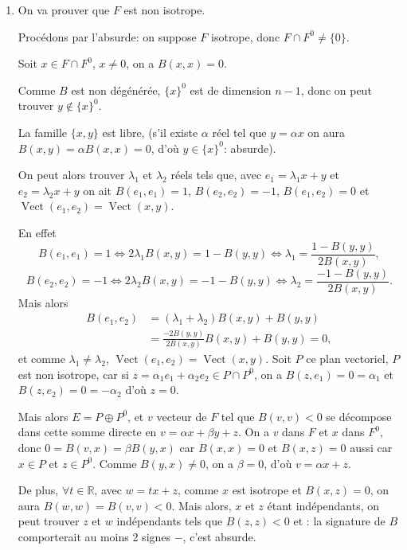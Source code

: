\begin{enumerate}[label=\arabic*.,leftmargin=2.2em,itemsep=1.1em]

\item On va prouver que $F$ est non isotrope.

Procédons par l'absurde: on suppose $F$ isotrope, donc $F\cap F^0\ne\{0\}$.

Soit $x\in F\cap F^0$, $x\ne0$, on a $B(x,x)=0$.

Comme $B$ est non dégénérée, $\{x\}^0$ est de dimension $n-1$, donc on peut trouver $y\notin\{x\}^0$.

La famille $\{x,y\}$ est libre, (s'il existe $\alpha$ réel tel que $y=\alpha x$ on aura $B(x,y)=\alpha B(x,x)=0$, d'où $y\in\{x\}^0$: absurde).

On peut alors trouver $\lambda_1$ et $\lambda_2$ réels tels que, avec $e_1=\lambda_1x+y$ et $e_2=\lambda_2x+y$ on ait $B(e_1,e_1)=1$, $B(e_2,e_2)=-1$, $B(e_1,e_2)=0$ et $\operatorname{Vect}(e_1,e_2)=\operatorname{Vect}(x,y)$.

En effet
\[
B(e_1,e_1)=1
\Longleftrightarrow 2\lambda_1B(x,y)=1-B(y,y)
\Longleftrightarrow
\lambda_1=\frac{1-B(y,y)}{2B(x,y)},
\]
\[
B(e_2,e_2)=-1
\Longleftrightarrow 2\lambda_2B(x,y)=-1-B(y,y)
\Longleftrightarrow
\lambda_2=\frac{-1-B(y,y)}{2B(x,y)}.
\]
Mais alors
\[
\begin{aligned}
B(e_1,e_2)
&=(\lambda_1+\lambda_2)B(x,y)+B(y,y)\\
&=\frac{-2B(y,y)}{2B(x,y)}B(x,y)+B(y,y)=0,
\end{aligned}
\]
et comme $\lambda_1\ne\lambda_2$, $\operatorname{Vect}(e_1,e_2)=\operatorname{Vect}(x,y)$. Soit $P$ ce plan vectoriel, $P$ est non isotrope, car si $z=\alpha_1e_1+\alpha_2e_2\in P\cap P^0$, on a $B(z,e_1)=0=\alpha_1$ et $B(z,e_2)=0=-\alpha_2$ d'où $z=0$.

Mais alors $E=P\oplus P^0$, et $v$ vecteur de $F$ tel que $B(v,v)<0$ se décompose dans cette somme directe en $v=\alpha x+\beta y+z$. On a $v$ dans $F$ et $x$ dans $F^0$, donc $0=B(v,x)=\beta B(y,x)$ car $B(x,x)=0$ et $B(x,z)=0$ aussi car $x\in P$ et $z\in P^0$. Comme $B(y,x)\ne0$, on a $\beta=0$, d'où $v=\alpha x+z$.

De plus, $\forall t\in\mathbb R$, avec $w=tx+z$, comme $x$ est isotrope et $B(x,z)=0$, on aura $B(w,w)=B(v,v)<0$. Mais alors, $x$ et $z$ étant indépendants, on peut trouver $z$ et $w$ indépendants tels que $B(z,z)<0$ et : la signature de $B$ comporterait au moins 2 signes $-$, c'est absurde.


\end{enumerate}
